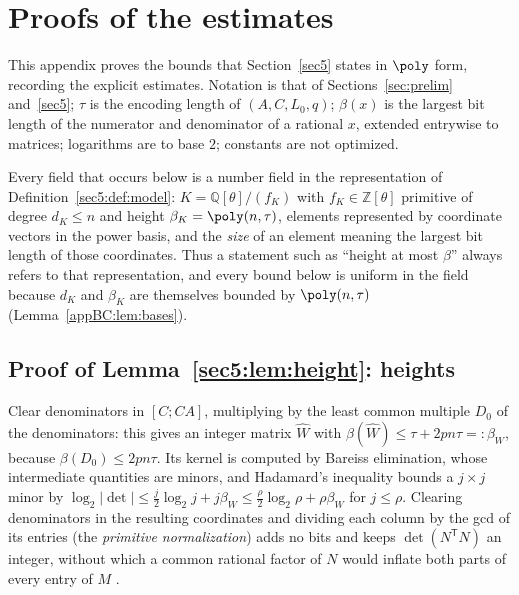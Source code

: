 \section{Proofs of the estimates}\label{appBC}\label{appB}\label{app:subresultant}

This appendix proves the bounds that Section~\ref{sec5} states in $\poly$ form, recording the explicit
estimates. Notation is that of Sections~\ref{sec:prelim} and~\ref{sec5}; $\tau$ is the encoding length
of $(A,C,L_0,q)$; $\beta(x)$ is the largest bit length of the numerator and denominator of a rational
$x$, extended entrywise to matrices; logarithms are to base $2$; constants are not optimized.

Every field that occurs below is a number field in the representation of
Definition~\ref{sec5:def:model}: $K=\mathbb{Q}[\theta]/(f_K)$ with $f_K\in\mathbb{Z}[\theta]$
primitive of degree $d_K\le n$ and height $\beta_K=\poly(n,\tau)$, elements represented by coordinate
vectors in the power basis, and the \emph{size} of an element meaning the largest bit length of those
coordinates. Thus a statement such as ``height at most $\beta$'' always refers to that representation,
and every bound below is uniform in the field because $d_K$ and $\beta_K$ are themselves bounded by
$\poly(n,\tau)$ (Lemma~\ref{appBC:lem:bases}).

\subsection{Proof of Lemma~\ref{sec5:lem:height}: heights}\label{appBC:sub:norm}

Clear denominators in $[C;CA]$, multiplying by the least common multiple $D_0$ of the denominators:
this gives an integer matrix $\widehat W$ with $\beta(\widehat W)\le\tau+2pn\tau=:\beta_W$, because
$\beta(D_0)\le2pn\tau$. Its kernel is computed by Bareiss elimination, whose intermediate quantities
are minors, and Hadamard's inequality bounds a $j\times j$ minor by
$\log_2|\det|\le\frac{j}{2}\log_2 j+j\beta_W\le\frac{\rho}{2}\log_2\rho+\rho\beta_W$ for
$j\le\rho$. Clearing denominators in the resulting coordinates and dividing each column by the gcd of
its entries (the \emph{primitive normalization}) adds no bits and keeps $\det(N^{\mathsf T}N)$ an
integer, without which a common rational factor of $N$ would inflate both parts of every entry of $M$
\cite{hj13,vzgg03}.

